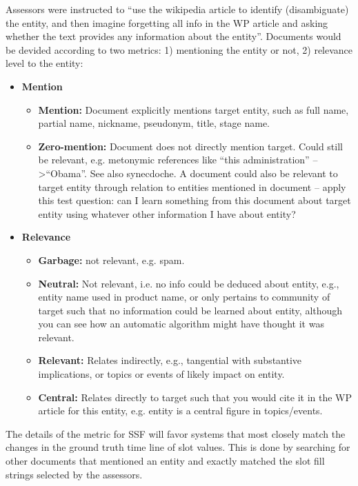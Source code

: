 Assessors were instructed to ``use the wikipedia article to identify (disambiguate) the entity, and then imagine forgetting all info in the WP article and asking whether the text provides any information about the entity''\cite{JFrank12}. Documents would be devided according to two metrics: 1) mentioning the entity or not, 2) relevance level to the entity:
\begin{itemize}
\item \textbf{Mention} 
\begin{itemize}
\item \textbf{Mention:} Document explicitly mentions target entity, such as full name, partial name, nickname, pseudonym, title, stage name.
\item \textbf{Zero-mention:} Document does not directly mention target. Could still be relevant, e.g. metonymic references like ``this administration'' -- \textgreater ``Obama''. See also synecdoche. A document could also be relevant to target entity through relation to entities mentioned in document -- apply this test question: can I learn something from this document about target entity using whatever other information I have about entity?
\end{itemize}
\item \textbf{Relevance}
\begin{itemize}
\item \textbf{Garbage:} not relevant, e.g. spam.
\item \textbf{Neutral:} Not relevant, i.e. no info could be deduced about entity, e.g., entity name used in product name, or only pertains to community of target such that no information could be learned about entity, although you can see how an automatic algorithm might have thought it was relevant.
\item \textbf{Relevant:} Relates indirectly, e.g., tangential with substantive implications, or topics or events of likely
impact on entity.
\item \textbf{Central:} Relates directly to target such that you would cite it in the WP article for this entity, e.g. entity is a
central figure in topics/events.



\end{itemize}
\end{itemize}

The details of the metric for SSF will favor systems that most closely match the changes in the ground truth time line of slot values. This is done by searching for other documents that mentioned an entity and exactly matched the slot fill strings selected by the assessors.



